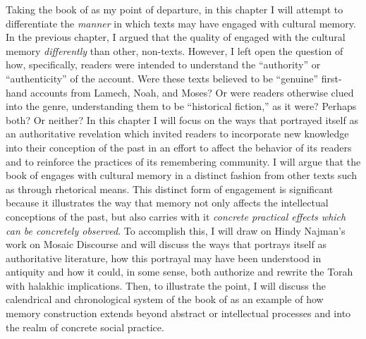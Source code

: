 Taking the book of \jub as my point of departure, in this chapter I will attempt to differentiate the \emph{manner} in which \rwb texts may have engaged with cultural memory. In the previous chapter, I argued that the \psgraphical quality of \ga engaged with the cultural memory \emph{differently} than other, non-\psgraphical texts. However, I left open the question of how, specifically, readers were intended to understand the ``authority'' or ``authenticity'' of the account. Were these \psgraphical texts believed to be ``genuine'' first-hand accounts from Lamech, Noah, and Moses? Or were readers otherwise clued into the genre, understanding them to be ``historical fiction,'' as it were? Perhaps both? Or neither? In this chapter I will focus on the ways that \jub portrayed itself as an authoritative revelation which invited readers to incorporate new knowledge into their conception of the past in an effort to affect the behavior of its readers and to reinforce the practices of its remembering community. I will argue that the book of \jub engages with cultural memory in a distinct fashion from other texts such as \ga through rhetorical means. This distinct form of engagement is significant because it illustrates the way that memory not only affects the intellectual conceptions of the past, but also carries with it \emph{concrete practical effects which can be concretely observed}. To accomplish this, I will draw on Hindy Najman's work on Mosaic Discourse and will discuss the ways that \jub portrays itself as authoritative literature, how this portrayal may have been understood in antiquity and how it could, in some sense, both authorize and rewrite the Torah with halakhic implications. Then, to illustrate the point, I will discuss the calendrical and chronological system of the book of \jub as an example of how memory construction extends beyond abstract or intellectual processes and into the realm of concrete social practice.


